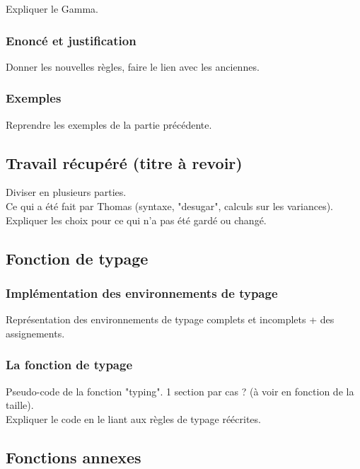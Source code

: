 \documentclass[11pt,a4paper]{article}
\begin{document}
Expliquer le Gamma.

\subsubsection{Enoncé et justification}

Donner les nouvelles règles, faire le lien avec les anciennes.

\subsubsection{Exemples}

Reprendre les exemples de la partie précédente.

\subsection{Travail récupéré (titre à revoir)}

Diviser en plusieurs parties.
\\
Ce qui a été fait par Thomas (syntaxe, "desugar", calculs sur les variances). 
\\
Expliquer les choix pour ce qui n'a pas été gardé ou changé. 

\subsection{Fonction de typage}

\subsubsection{Implémentation des environnements de typage}

Représentation des environnements de typage complets et incomplets + des assignements. 

\subsubsection{La fonction de typage}

Pseudo-code de la fonction "typing". 
1 section par cas ? (à voir en fonction de la taille).
\\
Expliquer le code en le liant aux règles de typage réécrites. 

\subsection{Fonctions annexes}
\end{document}
